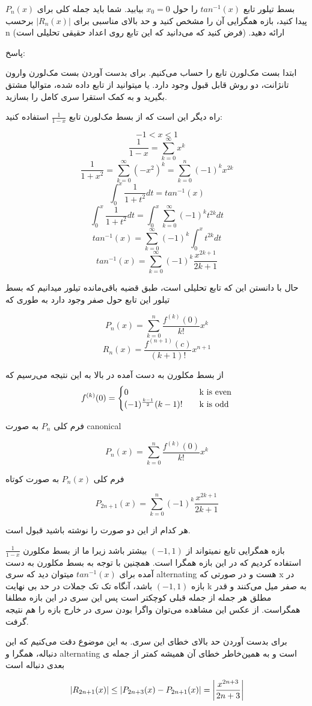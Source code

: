 بسط تیلور تابع 
$tan^{-1} (x)$
را  حول 
$x_0 = 0$
بیابید. شما باید جمله کلی برای 
$P_n(x)$
پیدا کنید، بازه همگرایی آن را مشخص کنید و حد بالای مناسبی برای 
$|R_n(x)|$
برحسب n ارائه دهید. (فرض کنید که می‌دانید که این تابع روی اعداد حقیقی تحلیلی است)

\begin{comment}
\end{comment}
پاسخ:

ابتدا بست مک‌لورن تابع را حساب می‌کنیم.
برای بدست آوردن بست مک‌لورن وارون تانژانت، دو روش قابل قبول وجود دارد. یا میتوانید از تابع داده شده، متوالیا مشتق بگیرید و به کمک استقرا سری کامل را بسازید.

راه دیگر این است که از بسط مک‌لورن تابع $\frac{1}{1-x}$ استفاده کنید:

$$-1 < x < 1$$
$$\frac{1}{1-x} = \sum_{k=0}^{\infty} x^k$$
$$\frac{1}{1+x^2} = \sum_{k=0}^{\infty} (-x^2) ^k = \sum_{k=0}^{n} (-1)^k x^{2k}$$
$$\int_{0}^{x} \frac{1}{1+t^2}dt = tan^{-1}(x)$$
$$\int_{0}^{x} \frac{1}{1+t^2}dt = \int_{0}^{x} \sum_{k=0}^{\infty} (-1)^k t^{2k} dt$$
$$tan^{-1}(x) = \sum_{k=0}^{\infty} (-1)^k \int_{0}^{x} t^{2k} dt$$
$$tan^{-1}(x) = \sum_{k=0}^{\infty} (-1)^k \frac{x^{2k+1}}{2k+1}$$

حال با دانستن این که تابع تحلیلی است، طبق قضیه باقی‌مانده تیلور میدانیم که بسط تیلور این تابع حول صفر وجود دارد به طوری که 

$$P_n(x) = \sum_{k=0}^{n} \frac{f^{(k)}(0)}{k!} x^k$$
$$R_n(x) = \frac{f^{(n+1)}(c)}{(k+1)!} x^{n+1}$$

از بسط مکلورن به دست آمده در بالا به این نتیجه می‌رسیم که
\[
f^{(k)}(0) = 
                \begin{cases}
                    \text{0} &\quad \text{k is even} \cr
                    (-1)^{\frac{k-1}{2}} (k-1)! &\quad \text{k is odd}
                \end{cases}
\]

فرم کلی $P_n$ به صورت canonical

$$P_n(x) = \sum_{k=0}^{n} \frac{f^{(k)}(0)}{k!}x^k$$

فرم کلی $P_n(x)$ به صورت کوتاه

$$P_{2n+1}(x) = \sum_{k=0}^{n} (-1)^k \frac{x^{2k+1}}{2k+1}$$

هر کدام از این دو صورت را نوشته باشید قبول است.

بازه همگرایی تابع نمیتواند از $(-1,1)$ بیشتر باشد زیرا ما از بسط مکلورن $\frac{1}{1-x}$ استفاده کردیم که در این بازه همگرا است.
همچنین با توجه به بسط مکلورن به دست آمده برای $tan^{-1}(x)$ میتوان دید که سری alternating هست و در صورتی که x در بازه $(-1,1)$ باشد، آنگاه تک تک جملات در حد بی نهایت k به صفر میل می‌کنند و قدر مطلق هر جمله از جمله قبلی کوچکتر است پس این سری در این بازه مطلفا همگراست. از عکس این مشاهده می‌توان واگرا بودن سری در خارج بازه را هم نتیجه گرفت.

برای بدست آوردن حد بالای خطای این سری. به این موضوع دقت می‌کنیم که این دنباله، همگرا و  alternating است و به همین‌خاطر خطای آن همیشه کمتر از جمله ی بعدی دنباله است

$$|R_{2n+1}(x)| \leq |P_{2n+3}(x) - P_{2n+1}(x)| = \abs{\frac{x^{2n+3}}{2n+3}}$$

